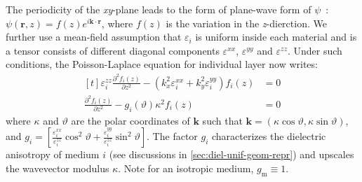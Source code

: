 %
The periodicity of the \textit{xy}-plane leads to the form of
plane-wave form of $\psi$~\cite{parsegian_van_2010_book}:
\(\psi(\mathbf{r}, z) =  
f(z) e^{i \mathbf{k} \cdot \mathbf{r}} \),
where \(f(z)\) is the variation in the \emph{z}-dierction.
%
We further use a mean-field assumption that $\varepsilon_{i}$ is
uniform inside each material and is a tensor
consists of different diagonal components \(\varepsilon^{xx}\),
\(\varepsilon^{yy}\) and
\(\varepsilon^{zz}\).
Under such conditions, the Poisson-Laplace equation for individual
layer now writes:
\begin{equation}
  \label{eq:vdw-laplace-2}
  \begin{aligned}[t]
\varepsilon_{i}^{zz} \frac{\partial^{2} f_{i}(z)}{\partial z^{2}}
- (k_{x}^{2} \varepsilon_{i}^{xx} + k_{y}^{2} \varepsilon_{i}^{yy}) f_{i}(z) &= 0    \\
\frac{\partial^{2} f_{i}(z)}{\partial z^{2}}
- g_{i}(\vartheta) \kappa^{2} f_{i}(z) &= 0
  \end{aligned}
\end{equation}
where $\kappa$ and $\vartheta$ are the polar coordinates of
$\mathbf{k}$ such that
\(\mathbf{k} = (\kappa \cos\mathcal{\vartheta}, \kappa\sin
\mathcal{\vartheta})\), and
\(g_{i} = [\frac{\varepsilon_{i}^{xx}}{\varepsilon_{i}^{zz}} \cos^{2}
  \vartheta + \frac{\varepsilon_{i}^{yy}}{\varepsilon_{i}^{zz}}
  \sin^{2} \vartheta]\).
%
The factor \(g_{i}\) characterizes the dielectric anisotropy of
medium $i$ (see discussions in \autoref{sec:diel-unif-geom-repr}) and
upscales the wavevector modulus \(\kappa\). Note for an isotropic
medium, $g_{\mathrm{m}}\equiv1$.

